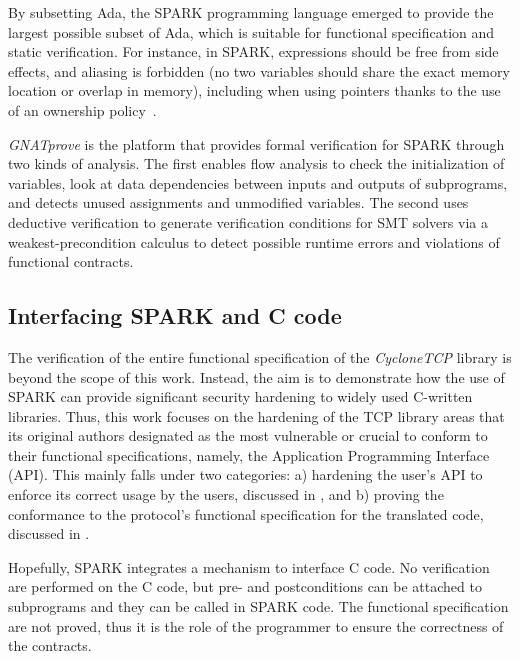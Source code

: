 \documentclass[conference]{IEEEtran}
\begin{document}
By subsetting Ada, the SPARK programming language \cite{mccormick_chapin_2015} emerged to provide the largest possible subset of Ada, which is suitable for functional specification and static verification. For instance, in SPARK, expressions should be free from side effects, and aliasing is forbidden (no two variables should share the exact memory location or overlap in memory), including when using pointers thanks to the use of an ownership policy~\cite{dross2020recursive}. 

\emph{GNATprove} \cite{GNATProve:users_manual} is the platform that provides formal verification for SPARK through two kinds of analysis. The first enables flow analysis to check the initialization of variables, look at data dependencies between inputs and outputs of subprograms, and detects unused assignments and unmodified variables. The second uses deductive verification to generate verification conditions for SMT solvers via a weakest-precondition calculus to detect possible runtime errors and violations of functional contracts.



\subsection{Interfacing SPARK and C code}

The verification of the entire functional specification of the \emph{CycloneTCP} library is beyond the scope of this work. Instead, the aim is to demonstrate how the use of SPARK can provide significant security hardening to widely used C-written libraries. Thus, this work focuses on the hardening of the TCP library areas that its original authors designated as the most vulnerable or crucial to conform to their functional specifications, namely, the Application Programming Interface (API). This mainly falls under two categories: a)  hardening the user's API to enforce its correct usage by the users, discussed in , and b) proving the conformance to the protocol's functional specification for the translated code, discussed in .


Hopefully, SPARK integrates a mechanism to interface C code. No verification are
performed on the C code, but pre- and postconditions can be attached to
subprograms and they can be called in SPARK code.
The functional specification are not proved, thus it is the role of the
programmer to ensure the correctness of the contracts.
\end{document}
